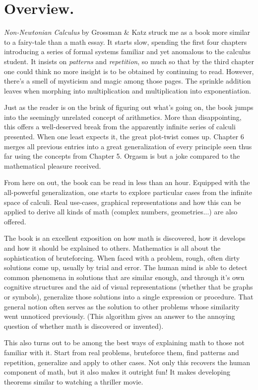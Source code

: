 \section{Overview.}

\textit{Non-Newtonian Calculus} by Grossman \& Katz struck me as a book more similar to a fairy-tale than a math essay. It starts slow, spending the first four chapters introducing a series of formal systems familiar and yet anomalous to the calculus student. It insists on \textit{patterns} and \textit{repetition}, so much so that by the third chapter one could think no more insight is to be obtained by continuing to read. However, there's a smell of mysticism and magic among those pages. The sprinkle addition leaves when morphing into multiplication and multiplication into exponentiation.

Just as the reader is on the brink of figuring out what's going on, the book jumps into the seemingly unrelated concept of arithmetics. More than disappointing, this offers a well-deserved break from the apparently infinite series of calculi presented. When one least expects it, the great plot-twist comes up. Chapter 6 merges all previous entries into a great generalization of every principle seen thus far using the concepts from Chapter 5. Orgasm is but a joke compared to the mathematical pleasure received.

From here on out, the book can be read in less than an hour. Equipped with the all-powerful generalization, one starts to explore particular cases from the infinite space of calculi. Real use-cases, graphical representations and how this can be applied to derive all kinds of math (complex numbers, geometries...) are also offered.

The book is an excellent exposition on how math is discovered, how it develops and how it should be explained to others. Mathematics is all about the sophistication of bruteforcing. When faced with a problem, rough, often dirty solutions come up, usually by trial and error. The human mind is able to detect common phenomena in solutions that are similar enough, and through it's own cognitive structures and the aid of visual representations (whether that be graphs or symbols), generalize those solutions into a single expression or procedure. That general notion often serves as the solution to other problems whose similarity went unnoticed previously. (This algorithm gives an answer to the annoying question of whether math is discovered or invented).

This also turns out to be among the best ways of explaining math to those not familiar with it. Start from real problems, bruteforce them, find patterns and repetition, generalize and apply to other cases. Not only this recovers the human component of math, but it also makes it outright fun! It makes developing theorems similar to watching a thriller movie.

